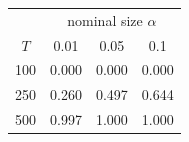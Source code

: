 % 
\begin{tabular}{cccc}
  \hline
  & \multicolumn{3}{c}{nominal size $\alpha$} \\
 $T$ & 0.01 & 0.05 & 0.1 \\
 \hline
100 & 0.000 & 0.000 & 0.000 \\ 
  250 & 0.260 & 0.497 & 0.644 \\ 
  500 & 0.997 & 1.000 & 1.000 \\ 
   \hline
\end{tabular}
